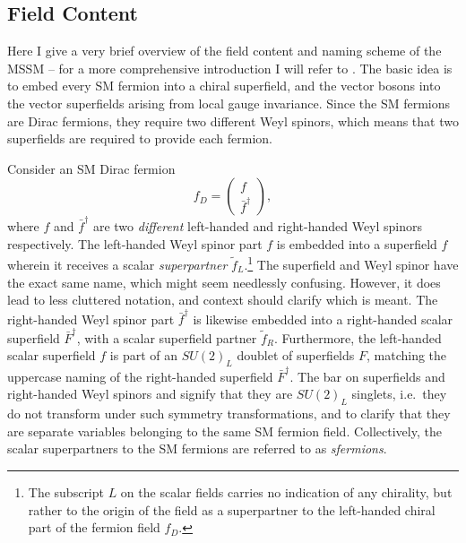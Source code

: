 \documentclass[../main.tex]{subfiles}
\begin{document}
\subsection{Field Content}
Here I give a very brief overview of the field content and naming scheme of the MSSM -- for a more comprehensive introduction I will refer to \needcite.
The basic idea is to embed every SM fermion into a chiral superfield, and the vector bosons into the vector superfields arising from local gauge invariance.
Since the SM fermions are Dirac fermions, they require two different Weyl spinors, which means that two superfields are required to provide each fermion.

Consider an SM Dirac fermion
\begin{equation}
  f_D = \begin{pmatrix}
    f \\ \bar{f}^\dagger
  \end{pmatrix},
\end{equation}
where \(f\) and \(\bar{f}^\dagger\) are two \emph{different} left-handed and right-handed Weyl spinors respectively.
The left-handed Weyl spinor part \(f\) is embedded into a superfield \(f\) wherein it receives a scalar \emph{superpartner} \(\tilde{f}_L\).\footnote{The subscript \(L\) on the scalar fields carries no indication of any chirality, but rather to the origin of the field as a superpartner to the left-handed chiral part of the fermion field \(f_D\).}
The superfield and Weyl spinor have the exact same name, which might seem needlessly confusing. However, it does lead to less cluttered notation, and context should clarify which is meant.
The right-handed Weyl spinor part \(\bar{f}^\dagger\) is likewise embedded into a right-handed scalar superfield \(\bar{F}^\dagger\), with a scalar superfield partner \(\tilde{f}_R\).
Furthermore, the left-handed scalar superfield \(f\) is part of an \(SU(2)_L\) doublet of superfields \(F\), matching the uppercase naming of the right-handed superfield \(\bar{F}^\dagger\).
The bar on superfields and right-handed Weyl spinors and signify that they are \(SU(2)_L\) singlets, i.e.\ they do not transform under such symmetry transformations, and to clarify that they are separate variables belonging to the same SM fermion field.
Collectively, the scalar superpartners to the SM fermions are referred to as \emph{sfermions}.
\end{document}

